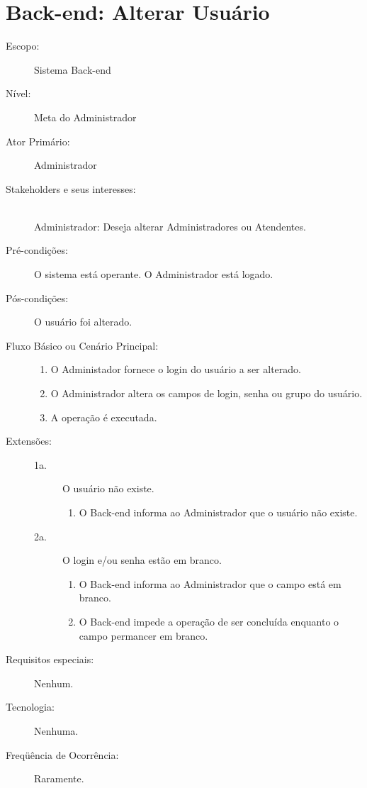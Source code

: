 \documentclass[brazil,times]{abnt}
\begin{document}
\section{Back-end: Alterar Usuário}
\begin{description}
\item[Escopo:] Sistema Back-end
\item[Nível:] Meta do Administrador
\item[Ator Primário:] Administrador
\item[Stakeholders e seus interesses:] \hfill \\
Administrador: Deseja alterar Administradores ou Atendentes.

\item[Pré-condições:] O sistema está operante. O Administrador está logado.
\item[Pós-condições:] O usuário foi alterado.
\item[Fluxo Básico ou Cenário Principal:]\hfill
\begin{enumerate}
  \item O Administador fornece o login do usuário a ser alterado.
  \item O Administrador altera os campos de login, senha ou grupo do
  usuário.
  \item A operação é executada.
\end{enumerate}

\item[Extensões:]\hfill
\begin{description}
	\item[1a.] O usuário não existe.
	\begin{enumerate}
 		\item O Back-end informa ao Administrador que o usuário não existe.
	\end{enumerate}
	\item[2a.] O login e/ou senha estão em branco.
	\begin{enumerate}
 		\item O Back-end informa ao Administrador que o campo está em branco.
 		\item O Back-end impede a operação de ser concluída enquanto o campo
 		permancer em branco.
	\end{enumerate}	

\end{description}
\item[Requisitos especiais:] Nenhum.
\item[Tecnologia:] Nenhuma.
\item[Freqüência de Ocorrência:] Raramente.

\end{description}
\end{document}
